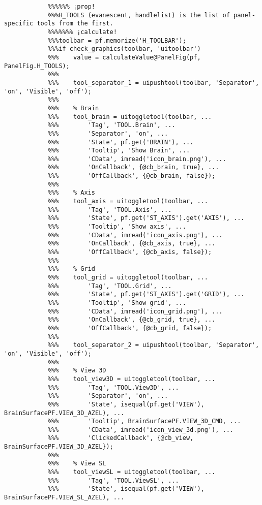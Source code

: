 \documentclass{tufte-handout}
\begin{document}
\begin{lstlisting}
            %%%%%% ¡prop!
            %%%H_TOOLS (evanescent, handlelist) is the list of panel-specific tools from the first.
            %%%%%%% ¡calculate!
            %%%toolbar = pf.memorize('H_TOOLBAR');
            %%%if check_graphics(toolbar, 'uitoolbar')
            %%%    value = calculateValue@PanelFig(pf, PanelFig.H_TOOLS);
            %%%    
            %%%    tool_separator_1 = uipushtool(toolbar, 'Separator', 'on', 'Visible', 'off');
            %%%
            %%%    % Brain
            %%%    tool_brain = uitoggletool(toolbar, ...
            %%%        'Tag', 'TOOL.Brain', ...
            %%%        'Separator', 'on', ...
            %%%        'State', pf.get('BRAIN'), ...
            %%%        'Tooltip', 'Show Brain', ...
            %%%        'CData', imread('icon_brain.png'), ...
            %%%        'OnCallback', {@cb_brain, true}, ...
            %%%        'OffCallback', {@cb_brain, false});
            %%%
            %%%    % Axis
            %%%    tool_axis = uitoggletool(toolbar, ...
            %%%        'Tag', 'TOOL.Axis', ...
            %%%        'State', pf.get('ST_AXIS').get('AXIS'), ...
            %%%        'Tooltip', 'Show axis', ...
            %%%        'CData', imread('icon_axis.png'), ...
            %%%        'OnCallback', {@cb_axis, true}, ...
            %%%        'OffCallback', {@cb_axis, false});
            %%%
            %%%    % Grid
            %%%    tool_grid = uitoggletool(toolbar, ...
            %%%        'Tag', 'TOOL.Grid', ...
            %%%        'State', pf.get('ST_AXIS').get('GRID'), ...
            %%%        'Tooltip', 'Show grid', ...
            %%%        'CData', imread('icon_grid.png'), ...
            %%%        'OnCallback', {@cb_grid, true}, ...
            %%%        'OffCallback', {@cb_grid, false});
            %%%        
            %%%    tool_separator_2 = uipushtool(toolbar, 'Separator', 'on', 'Visible', 'off');
            %%%
            %%%    % View 3D
            %%%    tool_view3D = uitoggletool(toolbar, ...
            %%%        'Tag', 'TOOL.View3D', ...
            %%%        'Separator', 'on', ... 
            %%%        'State', isequal(pf.get('VIEW'), BrainSurfacePF.VIEW_3D_AZEL), ...
            %%%        'Tooltip', BrainSurfacePF.VIEW_3D_CMD, ...
            %%%        'CData', imread('icon_view_3d.png'), ...
            %%%        'ClickedCallback', {@cb_view, BrainSurfacePF.VIEW_3D_AZEL});
            %%%
            %%%    % View SL
            %%%    tool_viewSL = uitoggletool(toolbar, ...
            %%%        'Tag', 'TOOL.ViewSL', ...
            %%%        'State', isequal(pf.get('VIEW'), BrainSurfacePF.VIEW_SL_AZEL), ...

\end{lstlisting}
\end{document}
